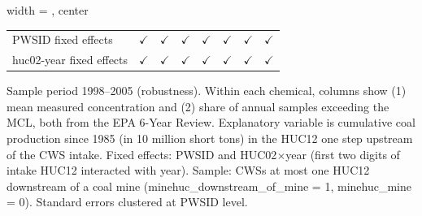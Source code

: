 \begin{table}[htbp]
\begin{adjustbox}{width = \textwidth, center}
\begin{tabular}{lccccccc}
          \\
         
         PWSID fixed effects                 & $\checkmark$           & $\checkmark$          & $\checkmark$  & $\checkmark$  & $\checkmark$        & $\checkmark$  & $\checkmark$\\   
         huc02-year fixed effects            & $\checkmark$           & $\checkmark$          & $\checkmark$  & $\checkmark$  & $\checkmark$        & $\checkmark$  & $\checkmark$\\   
         
         \bottomrule
         
      \end{tabular}
      
      
      
   \end{adjustbox}
      {\tiny\linespread{1}\selectfont \par \raggedright 
   Sample period 1998--2005 (robustness). Within each chemical, columns show (1) mean measured concentration and (2) share of annual samples exceeding the MCL, both from the EPA 6-Year Review. Explanatory variable is cumulative coal production since 1985 (in 10 million short tons) in the HUC12 one step upstream of the CWS intake. Fixed effects: PWSID and HUC02$\times$year (first two digits of intake HUC12 interacted with year). Sample: CWSs at most one HUC12 downstream of a coal mine (minehuc\_downstream\_of\_mine = 1, minehuc\_mine = 0). Standard errors clustered at PWSID level.}
   
\end{table}


